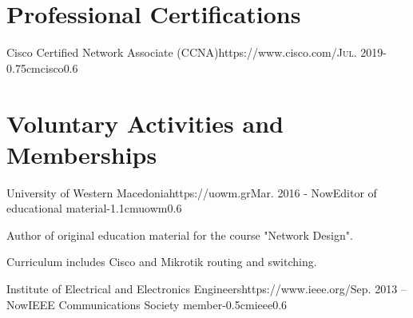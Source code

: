\documentclass{mycv}
\begin{document}
	
	\vspace{-0.25cm}
	\section{Professional Certifications}
	\begin{EntryDatedLogo}{Cisco Certified Network Associate (CCNA)}{https://www.cisco.com/}{\scshape{Jul. 2019}}{}{-0.75cm}{cisco}{0.6}
	\end{EntryDatedLogo}
	\vspace{0.25cm}
	
	\section{Voluntary Activities and Memberships}
	\vspace*{0.125cm}	
	\begin{EntryDatedLogo}{University of Western Macedonia}{https://uowm.gr}{Mar. 2016 - Now}{Editor of educational material}{-1.1cm}{uowm}{0.6}
	\begin{Itemize}
		\item Author of original education material for the course "Network Design".
		\item Curriculum includes Cisco and Mikrotik routing and switching.
	\end{Itemize}
	\end{EntryDatedLogo}

	\vspace*{0.5cm}
	
	\begin{EntryDatedLogo}{Institute of Electrical and Electronics Engineers}{https://www.ieee.org/}{Sep. 2013 -- Now}{IEEE Communications Society member}{-0.5cm}{ieee}{0.6}
	\end{EntryDatedLogo}
\end{document}
